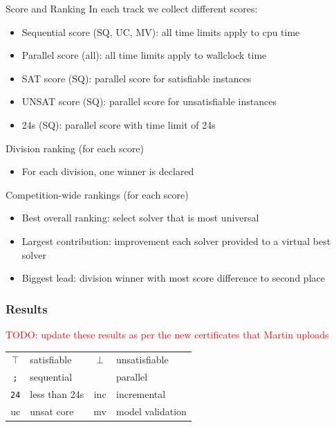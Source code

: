 \documentclass[table]{beamer}
\def\emph#1{\textcolor{MYblue}{#1}}
\begin{document}
\begin{frame}{Score and Ranking}
  In each track we collect different scores:
  \begin{itemize}
  \item \emph{Sequential score} (SQ, UC, MV): all time limits apply to cpu time
  \item \emph{Parallel score} (all): all time limits apply to wallclock time
  \item \emph{SAT score} (SQ): parallel score for \emph{satisfiable} instances
  \item \emph{UNSAT score} (SQ): parallel score for \emph{unsatisfiable} instances
  \item \emph{24s} (SQ): parallel score with time limit of \emph{24s}
  \end{itemize}
  \bigskip

  Division ranking (for each score)
  \begin{itemize}
  \item For each division, one winner is declared
  \end{itemize}

  \bigskip

  Competition-wide rankings (for each score)
  \begin{itemize}
  \item \emph{Best overall ranking}: select solver that is most universal  
  \item \emph{Largest contribution}: improvement each solver provided to a virtual best solver
  \item \emph{Biggest lead}: division winner with most score difference to second place
  \end{itemize}

\end{frame}

\newcommand{\seq}{\texttt{;}}
\newcommand{\paral}{\textbardbl}
\newcommand{\sat}{$\top$}
\newcommand{\unsat}{$\bot$}
\newcommand{\fast}{\texttt{24}}
\newcommand{\inc}{inc}
\newcommand{\uc}{uc}
\newcommand{\mv}{mv}
\newcommand{\cloud}{cloud}
\newcommand{\paralTrack}{parallel}

\begin{frame}
  \frametitle{Results}
  \textcolor{red}{TODO: update these results as per the new certificates that 
    Martin uploads}

  \begin{center}
    \begin{tabular}{|cl|cl|}
  \hline
  \sat & satisfiable & \unsat & unsatisfiable \\
  \seq & sequential & \paral & parallel \\
  \fast & less than 24s & \inc & incremental \\
  \uc & unsat core & \mv & model validation \\
  \hline
\end{tabular}
\end{center}
\end{frame}
\end{document}
